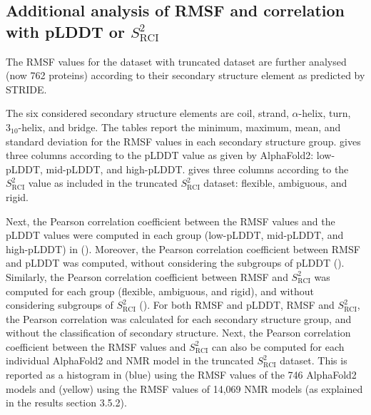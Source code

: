 \subsection*{Additional analysis of RMSF and correlation with pLDDT or $S_{\text{RCI}}^{2}$}

The RMSF values for the dataset with truncated dataset are further analysed (now 762 proteins) according to their secondary structure element as predicted by STRIDE.

The six considered secondary structure elements are coil, strand, $\alpha$-helix, turn, $3_{10}$-helix, and bridge. The tables report the minimum, maximum, mean, and standard deviation for the RMSF values in each secondary structure group.  gives three columns according to the pLDDT value as given by AlphaFold2: low-pLDDT, mid-pLDDT, and high-pLDDT.  gives three columns according to the $S_{\text{RCI}}^{2}$ value as included in the truncated $S_{\text{RCI}}^{2}$ dataset: flexible, ambiguous, and rigid.

Next, the Pearson correlation coefficient between the RMSF values and the pLDDT values were computed in each group (low-pLDDT, mid-pLDDT, and high-pLDDT) in (). Moreover, the Pearson correlation coefficient between RMSF and pLDDT was computed, without considering the subgroups of pLDDT (). Similarly, the Pearson correlation coefficient between RMSF and $S_{\text{RCI}}^{2}$ was computed for each group (flexible, ambiguous, and rigid), and without considering subgroups of $S_{\text{RCI}}^{2}$ (). For both RMSF and pLDDT, RMSF and $S_{\text{RCI}}^{2}$, the Pearson correlation was calculated for each secondary structure group, and without the classification of secondary structure.
Next, the Pearson correlation coefficient between the RMSF values and $S_{\text{RCI}}^{2}$ can also be computed for each individual AlphaFold2 and NMR model in the truncated $S_{\text{RCI}}^{2}$ dataset. This is reported as a histogram in  (blue) using the RMSF values of the 746 AlphaFold2 models and  (yellow) using the RMSF values of 14,069 NMR models (as explained in the results section 3.5.2).

